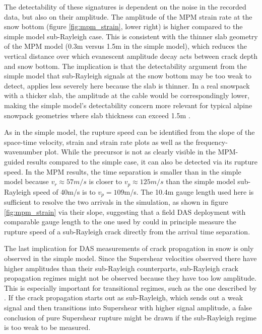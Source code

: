 The detectability of these signatures is dependent on the noise in the recorded data, but also on their amplitude. The amplitude of the MPM strain rate at the snow bottom (figure \ref{fig:mpm_strain}, lower right) is higher compared to the simple model sub-Rayleigh case. This is consistent with the thinner slab geometry of the MPM model (0.3m versus 1.5m in the simple model), which reduces the vertical distance over which evanescent amplitude decay acts between crack depth and snow bottom. The implication is that the detectability argument from the simple model that sub-Rayleigh
signals at the snow bottom may be too weak to detect, applies less
severely here because the slab is thinner. In a real snowpack with a
thicker slab, the amplitude at the cable would be correspondingly lower,
making the simple model's detectability concern more relevant for
typical alpine snowpack geometries where slab thickness can exceed 1.5m
\parencite{schweizerSnowAvalancheFormation2003,barteltPhysicalSNOWPACKModel2002}. \par

As in the simple model, the rupture speed can be identified from the slope of the space-time velocity, strain and strain rate plots as well as the frequency-wavenumber plot. While the precursor is not as clearly visible in the MPM-guided results compared to the simple case, it can also be detected via its rupture speed. In the MPM
results, the time separation is smaller than in the simple model because
$v_r \approx 57m/s$ is closer to $v_p \approx 125m/s$ than the
simple model sub-Rayleigh speed of 40m/s is to $v_p = 109$m/s.
The 10.4m
gauge length used here is sufficient to resolve the two arrivals in
the simulation, as shown in figure \ref{fig:mpm_strain} via their slope, suggesting that a  field DAS deployment with comparable gauge length to the one used by \cite{turquetAutomatedSnowAvalanche2024}
could in principle measure the rupture speed of a sub-Rayleigh 
crack directly from the arrival time separation.\par

The last implication for DAS measurements of crack propagation in snow is only observed in the simple model. Since the Supershear velocities observed there have higher amplitudes than their sub-Rayleigh counterparts, sub-Rayleigh crack propagation regimes might not be observed because they have too low amplitude. This is especially important for transitional regimes, such as the one described by \cite{trottetTransitionSubRayleighAnticrack2022,sironTheoreticalFrameworkDynamic2023}. If the crack propagation starts out as sub-Rayleigh, which sends out a weak signal and then transitions into Supershear with higher signal amplitude, a false conclusion of pure Supershear rupture might be drawn if the sub-Rayleigh regime is too weak to be measured. \par 


